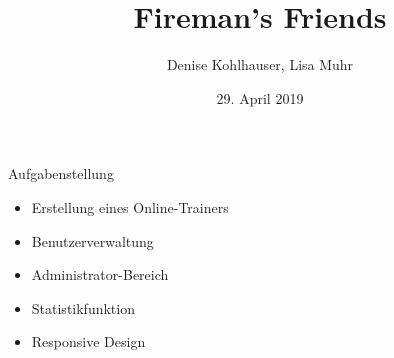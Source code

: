 \documentclass[aspectratio=169,14pt]{beamer}
\title{Fireman's Friends}
\author{Denise Kohlhauser, Lisa Muhr}
\institute{5AHIF}
\date{29. April 2019}
\begin{document}
    \begin{frame}
        \maketitle
    \end{frame}
    
    \begin{frame}[t]{Aufgabenstellung}
        \begin{itemize}[<+->]
            \item Erstellung eines Online-Trainers
            \item Benutzerverwaltung
            \item Administrator-Bereich
            \item Statistikfunktion
            \item Responsive Design
        \end{itemize}
    \end{frame}
    
\end{document}
